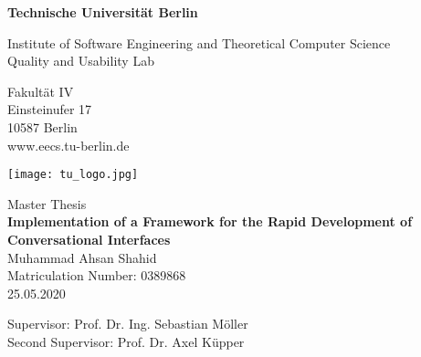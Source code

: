 \thispagestyle{empty}
\begin{center}

\vspace*{1cm}
{\LARGE \textbf{Technische Universität Berlin}}

\vspace{0.5cm}

{\large Institute of Software Engineering and Theoretical Computer Science\\[1mm]}
{\large Quality and Usability Lab\\[5mm]}

Fakultät IV\\
Einsteinufer 17\\
10587 Berlin\\
www.eecs.tu-berlin.de\\

\vspace*{0.8cm}

\texttt{[image: tu\_logo.jpg]}

\vspace*{0.8cm}

{\LARGE Master Thesis}\\

\vspace{0.8cm}
{\LARGE \textbf{Implementation of a Framework for the Rapid Development of Conversational Interfaces}}\\
\vspace*{1.0cm}
{\LARGE Muhammad Ahsan Shahid}
\\
\vspace*{0.5cm}
Matriculation Number: 0389868\\
25.05.2020\\  %
\vspace*{0.8cm}

Supervisor: Prof. Dr. Ing. Sebastian Möller\\
\vspace*{0.4cm}
Second Supervisor: Prof. Dr. Axel Küpper
\vspace*{0.4cm}



\end{center}
